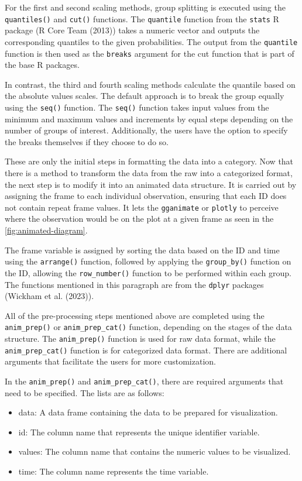For the first and second scaling methods, group splitting is executed using the \texttt{quantiles()} and \texttt{cut()} functions. The \texttt{quantile} function from the \texttt{stats} R package (R Core Team (2013)) takes a numeric vector and outputs the corresponding quantiles to the given probabilities. The output from the \texttt{quantile} function is then used as the \texttt{breaks} argument for the cut function that is part of the base R packages.

In contrast, the third and fourth scaling methods calculate the quantile based on the absolute values scales. The default approach is to break the group equally using the \texttt{seq()} function. The \texttt{seq()} function takes input values from the minimum and maximum values and increments by equal steps depending on the number of groups of interest. Additionally, the users have the option to specify the breaks themselves if they choose to do so.

These are only the initial steps in formatting the data into a category. Now that there is a method to transform the data from the raw into a categorized format, the next step is to modify it into an animated data structure. It is carried out by assigning the frame to each individual observation, ensuring that each ID does not contain repeat frame values. It lets the \texttt{gganimate} or \texttt{plotly} to perceive where the observation would be on the plot at a given frame as seen in the \ref{fig:animated-diagram}.

The frame variable is assigned by sorting the data based on the ID and time using the \texttt{arrange()} function, followed by applying the \texttt{group\_by()} function on the ID, allowing the \texttt{row\_number()} function to be performed within each group. The functions mentioned in this paragraph are from the \texttt{dplyr} packages (Wickham et al. (2023)).

All of the pre-processing steps mentioned above are completed using the \texttt{anim\_prep()} or \texttt{anim\_prep\_cat()} function, depending on the stages of the data structure. The \texttt{anim\_prep()} function is used for raw data format, while the \texttt{anim\_prep\_cat()} function is for categorized data format. There are additional arguments that facilitate the users for more customization.

In the \texttt{anim\_prep()} and \texttt{anim\_prep\_cat()}, there are required arguments that need to be specified. The lists are as follows:

\begin{itemize}
\tightlist
\item
  data: A data frame containing the data to be prepared for visualization.
\item
  id: The column name that represents the unique identifier variable.
\item
  values: The column name that contains the numeric values to be visualized.
\item
  time: The column name represents the time variable.
\end{itemize}

